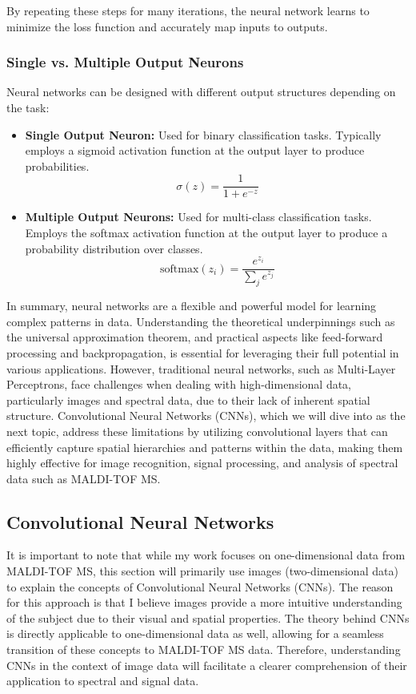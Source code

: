 \documentclass[english,11pt,a4paper,titlepage]{article}
\begin{document}
	By repeating these steps for many iterations, the neural network learns to minimize the loss function and accurately map inputs to outputs.
	
	
	\subsubsection*{Single vs. Multiple Output Neurons}
	Neural networks can be designed with different output structures depending on the task:
	\begin{itemize}
		\item \textbf{Single Output Neuron:} Used for binary classification tasks. Typically employs a sigmoid activation function at the output layer to produce probabilities.
		\begin{equation*}
			\sigma(z) = \frac{1}{1 + e^{-z}}
		\end{equation*}
		\item \textbf{Multiple Output Neurons:} Used for multi-class classification tasks. Employs the softmax activation function at the output layer to produce a probability distribution over classes.
		\begin{equation*}
			\text{softmax}(z_i) = \frac{e^{z_i}}{\sum_{j} e^{z_j}}
		\end{equation*}
	\end{itemize}
	
	In summary, neural networks are a flexible and powerful model for learning complex patterns in data. Understanding the theoretical underpinnings such as the universal approximation theorem, and practical aspects like feed-forward processing and backpropagation, is essential for leveraging their full potential in various applications. However, traditional neural networks, such as Multi-Layer Perceptrons, face challenges when dealing with high-dimensional data, particularly images and spectral data, due to their lack of inherent spatial structure. Convolutional Neural Networks (CNNs), which we will dive into as the next topic, address these limitations by utilizing convolutional layers that can efficiently capture spatial hierarchies and patterns within the data, making them highly effective for image recognition, signal processing, and analysis of spectral data such as MALDI-TOF MS.
	
	\subsection*{Convolutional Neural Networks}
	It is important to note that while my work focuses on one-dimensional data from MALDI-TOF MS, this section will primarily use images (two-dimensional data) to explain the concepts of Convolutional Neural Networks (CNNs). The reason for this approach is that I believe images provide a more intuitive understanding of the subject due to their visual and spatial properties. The theory behind CNNs is directly applicable to one-dimensional data as well, allowing for a seamless transition of these concepts to MALDI-TOF MS data. Therefore, understanding CNNs in the context of image data will facilitate a clearer comprehension of their application to spectral and signal data.
	
\end{document}
